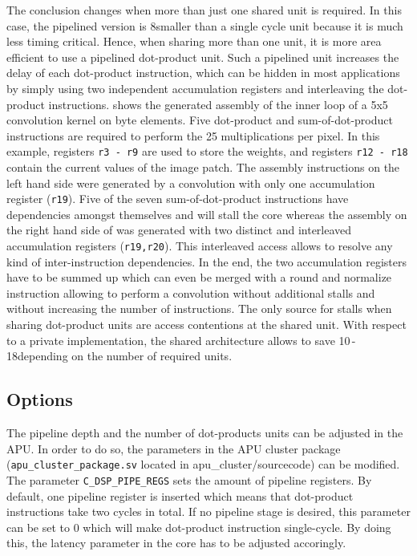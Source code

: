 \documentclass[%
 oneside,      %
 openany,      %
 halfparskip,  %
]{scrbook}
\begin{document}
The conclusion changes when more than just one shared unit is required. In this case, the pipelined version is 8\kGE smaller than a single cycle unit because it is much less timing critical. Hence, when sharing more than one unit, it is more area efficient to use a pipelined dot-product unit. Such a pipelined unit increases the delay of each dot-product instruction, which can be hidden in most applications by simply using two independent accumulation registers and interleaving the dot-product instructions.  shows the generated assembly of the inner loop of a 5x5 convolution kernel on byte elements. Five dot-product and sum-of-dot-product instructions are required to perform the 25 multiplications per pixel. In this example, registers \texttt{r3\,-\,r9} are used to store the weights, and registers \texttt{r12\,-\,r18} contain the current values of the image patch. The assembly instructions on the left hand side were generated by a convolution with only one accumulation register (\texttt{r19}). Five of the seven sum-of-dot-product instructions have dependencies amongst themselves and will stall the core whereas the assembly on the right hand side of  was generated with two distinct and interleaved accumulation registers (\texttt{r19,r20}). This interleaved access allows to resolve any kind of inter-instruction dependencies. In the end, the two accumulation registers have to be summed up which can even be merged with a round and normalize instruction allowing to perform a convolution without additional stalls and without increasing the number of instructions. The only source for stalls when sharing dot-product units are access contentions at the shared unit.
%
With respect to a private implementation, the shared architecture allows to save 10\,-\,18\kGE depending on the number of required units.


\subsection{Options}
The pipeline depth and the number of dot-products units can be adjusted in the APU. In order to do so, the parameters in the APU cluster package (\texttt{apu\_cluster\_package.sv} located in apu\_cluster/sourcecode) can be modified. The parameter \texttt{C\_DSP\_PIPE\_REGS} sets the amount of pipeline registers. By default, one pipeline register is inserted which means that dot-product instructions take two cycles in total. If no pipeline stage is desired, this parameter can be set to 0 which will make dot-product instruction single-cycle. By doing this, the latency parameter in the core has to be adjusted accoringly.
\end{document}
